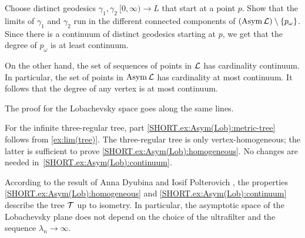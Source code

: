 Choose distinct geodesics $\gamma_1,\gamma_2\:[0,\infty)\to L$ that start at a point $p$.
Show that the limits of $\gamma_1$ and $\gamma_2$ run in the different connected components of $(\mathop{\rm Asym}\nolimits\mathcal{L})\setminus \{p_\omega\}$.
Since there is a continuum of distinct geodesics starting at $p$,
we get that the degree of $p_\omega$ is at least continuum.

On the other hand, the set of sequences of points in $\mathcal{L}$  has cardinality continuum.
In particular, the set of points in $\mathop{\rm Asym}\nolimits\mathcal{L}$ has cardinality at most continuum.
It follows that the degree of any vertex is at most continuum.


The proof for the Lobachevsky space goes along the same lines.

For the infinite three-regular tree, part \ref{SHORT.ex:Asym(Lob):metric-tree} follows from \ref{ex:lim(tree)}.
The three-regular tree is only vertex-homogeneous; the latter is sufficient to prove \ref{SHORT.ex:Asym(Lob):homogeneous}.
No changes are needed in~\ref{SHORT.ex:Asym(Lob):continuum}.

According to the result of Anna Dyubina and Iosif Polterovich \cite{dyubina-polterovich}, the properties \ref{SHORT.ex:Asym(Lob):homogeneous} and \ref{SHORT.ex:Asym(Lob):continuum} describe the tree $\mathcal{T}$ up to isometry.
In particular, the asymptotic space of the Lobachevsky plane does not depend on the choice of the ultrafilter and the sequence $\lambda_n\to \infty$.
